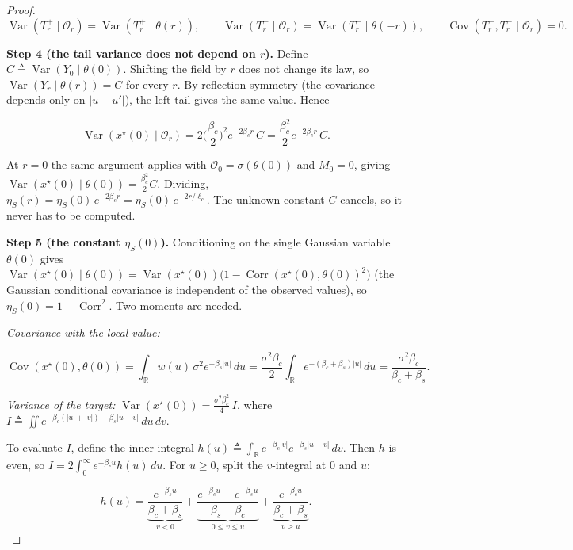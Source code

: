 \begin{proof}
\[
\operatorname{Var}(T_r^+\mid\mathcal O_r)=\operatorname{Var}(T_r^+\mid\theta(r)),\qquad \operatorname{Var}(T_r^-\mid\mathcal O_r)=\operatorname{Var}(T_r^-\mid\theta(-r)),\qquad \operatorname{Cov}(T_r^+,T_r^-\mid\mathcal O_r)=0 .
\]

\textbf{Step 4 (the tail variance does not depend on $r$).} Define $C\triangleq\operatorname{Var}(Y_0\mid\theta(0))$. Shifting the field by $r$ does not change its law, so $\operatorname{Var}(Y_r\mid\theta(r))=C$ for every $r$. By reflection symmetry (the covariance depends only on $|u-u'|$), the left tail gives the same value. Hence

\[
\operatorname{Var}(x^\star(0)\mid\mathcal O_r)=2\Big(\frac{\beta_c}{2}\Big)^2e^{-2\beta_c r}\,C=\frac{\beta_c^2}{2}e^{-2\beta_c r}\,C .
\]

At $r=0$ the same argument applies with $\mathcal O_0=\sigma(\theta(0))$ and $M_0=0$, giving $\operatorname{Var}(x^\star(0)\mid\theta(0))=\tfrac{\beta_c^2}{2}C$. Dividing, $\eta_S(r)=\eta_S(0)\,e^{-2\beta_c r}=\eta_S(0)\,e^{-2r/\ell_c}$. The unknown constant $C$ cancels, so it never has to be computed.

\textbf{Step 5 (the constant $\eta_S(0)$).} Conditioning on the single Gaussian variable $\theta(0)$ gives $\operatorname{Var}(x^\star(0)\mid\theta(0))=\operatorname{Var}(x^\star(0))\big(1-\operatorname{Corr}(x^\star(0),\theta(0))^2\big)$ (the Gaussian conditional covariance is independent of the observed values), so $\eta_S(0)=1-\operatorname{Corr}^2$. Two moments are needed.

\emph{Covariance with the local value:}

\[
\operatorname{Cov}(x^\star(0),\theta(0))=\int_{\mathbb R}w(u)\,\sigma^2e^{-\beta_s|u|}\,du=\frac{\sigma^2\beta_c}{2}\int_{\mathbb R}e^{-(\beta_c+\beta_s)|u|}\,du=\frac{\sigma^2\beta_c}{\beta_c+\beta_s}.
\]

\emph{Variance of the target:} $\operatorname{Var}(x^\star(0))=\frac{\sigma^2\beta_c^2}{4}\,I$, where $I\triangleq\iint e^{-\beta_c(|u|+|v|)-\beta_s|u-v|}\,du\,dv$.

To evaluate $I$, define the inner integral $h(u)\triangleq\int_{\mathbb R}e^{-\beta_c|v|}e^{-\beta_s|u-v|}\,dv$. Then $h$ is even, so $I=2\int_0^\infty e^{-\beta_c u}h(u)\,du$. For $u\ge0$, split the $v$-integral at $0$ and $u$:

\[
h(u)=\underbrace{\frac{e^{-\beta_s u}}{\beta_c+\beta_s}}_{v<0}+\underbrace{\frac{e^{-\beta_c u}-e^{-\beta_s u}}{\beta_s-\beta_c}}_{0\le v\le u}+\underbrace{\frac{e^{-\beta_c u}}{\beta_c+\beta_s}}_{v>u}.
\]


\end{proof}
